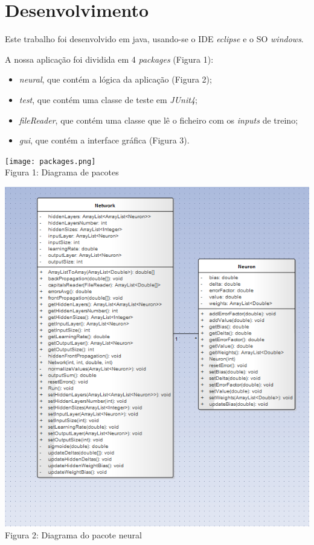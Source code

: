 \documentclass[a4paper]{article}
\begin{document}
\section{Desenvolvimento}

Este trabalho foi desenvolvido em java, usando-se o IDE \textit {eclipse} e o SO \textit{windows}.

A nossa aplicação foi dividida em 4 \textit{packages} (Figura 1): 
\begin{itemize}
\item  \textit{neural}, que contém a lógica da aplicação (Figura 2);
\item  \textit{test}, que contém uma classe de teste em \textit{JUnit4};
\item \textit{fileReader}, que contém uma classe que lê o ficheiro com os \textit{inputs} de treino;
\item \textit{gui}, que contém a interface gráfica (Figura 3).
\end{itemize}


\texttt{[image: packages.png]}
\\Figura 1: Diagrama de pacotes\linebreak\linebreak




\includegraphics[scale=0.5]{neural.png}
\\Figura 2: Diagrama do pacote neural\linebreak\linebreak
\end{document}
